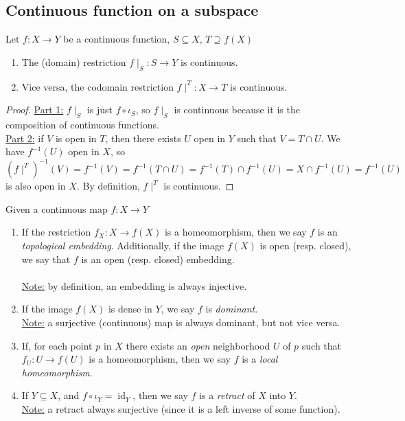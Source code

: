 \documentclass{treatise}
\begin{document}
\subsection{Continuous function on a subspace}
\begin{proposition}[Restriction] \label{topo-res-cont}
Let $f: X \to Y$ be a continuous function, $S \subseteq X$, $T \supseteq f(X)$
\begin{enumerate}
    \item The (domain) restriction $f \mid_S : S \to Y$ is continuous.
    \item Vice versa, the codomain restriction $f \mid^T : X \to T$ is continuous.
\end{enumerate}
\end{proposition}
\begin{proof}
\underline{Part 1:} $f \mid_S$ is just $f \circ \iota_S$, so $f \mid_S$ is continuous because it is the composition of continuous functions.
\\
\underline{Part 2:} if $V$ is open in $T$, then there exists $U$ open in $Y$ such that $V = T \cap U$. We have $f^{-1}(U)$ open in $X$, so $(f \mid^T)^{-1}(V) = f^{-1}(V) = f^{-1}(T \cap U) = f^{-1}(T) \cap f^{-1}(U) = X \cap f^{-1}(U) = f^{-1}(U)$ is also open in $X$. By definition, $f \mid^T$ is continuous.
\end{proof}
Given a continuous map $f: X \to Y$
\begin{enumerate}
    \item If the restriction $f_X : X \to f(X)$ is a homeomorphism, then we say $f$ is an \emph{topological embedding}. Additionally, if the image $f(X)$ is open (resp. closed), we say that $f$ is an open (resp. closed) embedding.
    \\
    \\
    \underline{Note:} by definition, an embedding is always injective.
    \item If the image $f(X)$ is dense in $Y$, we say $f$ is \emph{dominant}.
    \\
    \underline{Note:} a surjective (continuous) map is always dominant, but not vice versa.
    \item If, for each point $p$ in $X$ there exists an \textit{open} neighborhood $U$ of $p$ such that $f_U : U \to f(U)$ is a homeomorphism, then we say $f$ is a \emph{local homeomorphism}.
    \item If $Y \subseteq X$, and $f \circ \iota_Y = \operatorname{id}_Y$, then we say $f$ is a \emph{retract} of $X$ into $Y$.
    \\
    \underline{Note:} a retract always surjective (since it is a left inverse of some function).
\end{enumerate}
\end{document}
